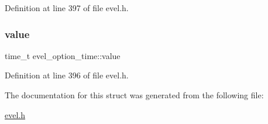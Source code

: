 Definition at line 397 of file evel.\+h.

\hypertarget{structevel__option__time_a828c462ef4375392d682f18e8f6fd1b6}{}\label{structevel__option__time_a828c462ef4375392d682f18e8f6fd1b6} 
\subsubsection{\texorpdfstring{value}{value}}
{\footnotesize\ttfamily time\+\_\+t evel\+\_\+option\+\_\+time\+::value}



Definition at line 396 of file evel.\+h.



The documentation for this struct was generated from the following file\+:\begin{DoxyCompactItemize}
\item 
\hyperlink{evel_8h}{evel.\+h}\end{DoxyCompactItemize}
